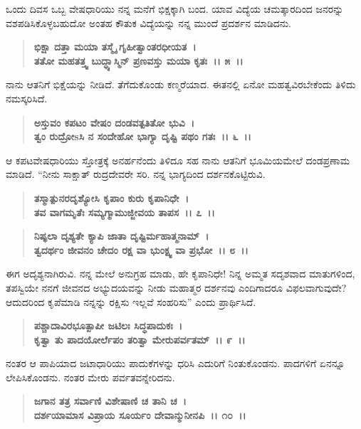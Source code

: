 ಒಂದು ದಿವಸ ಒಬ್ಬ ವೇಷಧಾರಿಯು ನನ್ನ ಮನೆಗೆ ಭಿಕ್ಷಕ್ಕಾಗಿ ಬಂದ. ಯಾವ ವಿದ್ಯೆಯ ಚಮತ್ಕಾರದಿಂದ ಜನರನ್ನು ವಶಪಡಿಸಿಕೊಳ್ಳಬಹುದೋ ಅಂತಹ ಕೌತುಕ ವಿದ್ಯೆಯನ್ನು ನನ್ನ ಮುಂದೆ ಪ್ರದರ್ಶನ ಮಾಡಿದನು.

\begin{verse}
\textbf{ಭಿಕ್ಷಾ ದತ್ತಾ ಮಯಾ ತಸ್ಮೈ ಗೃಹೀತ್ವಾಂತರಧೀಯತ~।}\\\textbf{ತತೋ ಮಹತತ್ತ್ವ ಬುದ್ಧ್ಯಾಸ್ಮಿನ್ ಪ್ರಣವಸ್ತು ಮಯಾ ಕೃತಃ~।। ೫~।।}
\end{verse}

ನಾನು ಆತನಿಗೆ ಭಿಕ್ಷೆಯನ್ನು ನೀಡಿದೆ. ತೆಗೆದುಕೊಂಡು ಕಣ್ಮರೆಯಾದ. ಈತನಲ್ಲಿ ಏನೋ ಮಹತ್ವವಿರಬೇಕೆಂದು ತಿಳಿದು ನಮಸ್ಕರಿಸಿದೆ.

\begin{verse}
\textbf{ಅಸ್ತುವಂ ಕಪಟಂ ವೇಷಂ ದಂಡವತ್ಪತಿತೋ ಭುವಿ~।}\\\textbf{ತ್ವಂ ರುದ್ರೋsಸಿ ನ ಸಂದೇಹೋ ಭಾಗ್ಯಾ ದೃಷ್ಟಿ ಪಥಂ ಗತಃ~।। ೬~।।}
\end{verse}

ಆ ಕಪಟವೇಷಧಾರಿಯು ಸ್ತೋತ್ರಕ್ಕೆ ಅನರ್ಹನೆಂದು ತಿಳಿದೂ ಸಹ ನಾನು ಆತನಿಗೆ ಭೂಮಿಯಮೇಲೆ ದಂಡಪ್ರಣಾಮ ಮಾಡಿದೆ. “ನೀನು ಸಾಕ್ಷಾತ್ ರುದ್ರದೇವರೇ ಸರಿ. ನನ್ನ ಭಾಗ್ಯದಿಂದ ದರ್ಶನಕೊಟ್ಟಿರುವಿ.

\begin{verse}
\textbf{ತಸ್ಮಾತ್ಪುನರದೃಶ್ಯೋಸಿ ಕೃಪಾಂ ಕುರು ಕೃಪಾನಿಧೇ~।}\\\textbf{ತವ ವಾಗಮೃತೆಃ ಸಮ್ಯಗ್ಮಾಮುಜ್ಜೀವಯ ತಾಪಸ~।। ೭~।।} 
\end{verse}

\begin{verse}
\textbf{ನಿಷ್ಫಲಾ ದೃಶ್ಯತೇ ಕ್ಯಾಪಿ ಜಾತಾ ದೃಷ್ಟಿರ್ಮಹಾತ್ಮನಾಮ್~।}\\\textbf{ತ್ವದರ್ಥಂ ಜೀವನಂ ಚೇದಂ ರಕ್ಷ ವಾ ಭುಂಕ್ಷ್ವ ವಾ ಪ್ರಭೋ~।। ೮~।।}
\end{verse}

ಈಗ ಅದೃಶ್ಯನಾಗಿರುವಿ. ನನ್ನ ಮೇಲೆ ಅನುಗ್ರಹ ಮಾಡು, ಹೇ ಕೃಪಾನಿಧೇ! ನಿನ್ನ ಅಮ್ಮತ ಸದೃಶವಾದ ಮಾತುಗಳಿಂದ, ತಪಸ್ವಿಯೇ ನನಗೆ ಜೀವನದ ಅಭ್ಯುದಯವನ್ನು ನೀಡು ಮಹಾತ್ಮರ ದರ್ಶನವು ಎಂದಿಗಾದರೂ ವಿಫಲವಾಗುವುದೇ? ಆದುದರಿಂದ ಕೃಪೆಮಾಡಿ ನನ್ನನ್ನು ರಕ್ಷಿಸು ಇಲ್ಲವೆ ಸಂಹರಿಸು” ಎಂದು ಪ್ರಾರ್ಥಿಸಿದೆ.

\begin{verse}
\textbf{ಪಶ್ಚಾದಾವಿರಭೂತ್ಪಾಪೀ ಜಟಿಲಃ ಸಿದ್ಧಪಾದುಕಃ~।}\\\textbf{ಕೃತ್ವಾ ತು ಪಾದಯೋರ್ಲೆಪಂ ತರಿತ್ವಾ ಮೇರುಪರ್ವತಮ್~।। ೯~।।}
\end{verse}

ನಂತರ ಆ ಪಾಪಿಯಾದ ಜಟಾಧಾರಿಯು ಪಾದುಕೆಗಳನ್ನು ಧರಿಸಿ ಎದುರಿಗೆ ನಿಂತುಕೊಂಡನು. ಪಾದಗಳಿಗೆ ಏನನ್ನೂ ಲೇಪಿಸಿಕೊಂಡನು. ನಂತರ ಮೇರು ಪರ್ವತವನ್ನೇರಿದನು.

\begin{verse}
\textbf{ಜಗಾನ ತತ್ರ ಸರ್ವಾಣಿ ವಿಶೇಷಾಣಿ ಚ ತಾನಿ ಚ~।}\\\textbf{ದರ್ಶಯಾಮಾಸ ವಿಪ್ರಾಯ ಸೂರ್ಯಂ ದೇವಾನ್ಮುನೀನಪಿ~।। ೧೦~।। }
\end{verse}

